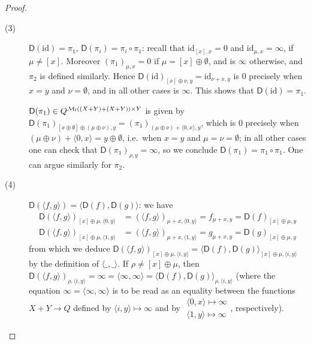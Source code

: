 \begin{proof}
\begin{description}
\item[(3)] $\mathsf D(\mathrm{id})=\pi_{1}$, $\mathsf D(\pi_{i})=\pi_{i}\circ \pi_{1}$: 
recall that $\mathrm{id}_{[x],x}=0$ and $\mathrm{id}_{\mu,x}=\infty$, if $\mu\neq [x]$. 
Moreover $(\pi_{1})_{\mu,x}=0$ if $\mu=[x]\oplus \emptyset$, and is $\infty$ otherwise, and $\pi_{2}$ is defined similarly.
Hence 
$\mathsf D(\mathrm{id})_{[x]\oplus\nu,y}=\mathrm{id}_{\nu+x,y}$ is $0$ precisely when $x=y$ and $\nu=\emptyset$, and in all other cases is $\infty$. This shows that $\mathsf D(\mathrm{id})=\pi_{1}$. 

$\mathsf D(\pi_{1})\in Q^{\mathcal{M}_{\mathsf f}((X+Y)+(X+Y))\times Y}$ is given by
$\mathsf D(\pi_{1})
_{
[x\oplus \emptyset] \oplus (\mu\oplus\nu),y
}= (\pi_{1})_{(\mu\oplus\nu)+\langle 0,x\rangle ,y }
$, 
which is 0 precisely when $(\mu\oplus\nu)+\langle 0,x\rangle= y\oplus\emptyset$, i.e.~when 
$x=y$ and $\mu=\nu=\emptyset$; in all other cases one can check that $\mathsf D(\pi_{1})_{\rho,y}=\infty$, so we conclude $\mathsf D(\pi_{1})=\pi_{1}\circ \pi_{1}$.
One can argue similarly for $\pi_{2}$.

\item[(4)] $\mathsf D(\langle f,g\rangle)=\langle \mathsf D(f),\mathsf D(g)\rangle$: 
we have
\begin{align*}
\mathsf D(\langle f,g\rangle)_{[x]\oplus\mu, \langle 0,y\rangle}& = 
(\langle f,g\rangle)_{\mu+x,\langle 0,y\rangle}= f_{\mu+x,y}= \mathsf D(f)_{[x]\oplus \mu,y}\\
\mathsf D(\langle f,g\rangle)_{[x]\oplus\mu, \langle 1,y\rangle}& = 
(\langle f,g\rangle)_{\mu+x,\langle 1,y\rangle}= g_{\mu+x,y}= \mathsf D(g)_{[x]\oplus \mu,y}
\end{align*}
from which we deduce
$\mathsf D(\langle f,g\rangle)_{[x]\oplus\mu, \langle i,y\rangle}=\langle \mathsf D(f),\mathsf D(g)\rangle_{[x]\oplus\mu, \langle i,y\rangle}$ 
 by the definition of $\langle \_,\_\rangle$.
 If $\rho\neq [x]\oplus\mu$, then
 $\mathsf D(\langle f,g\rangle)_{\rho, \langle i,y\rangle}=\infty=\langle \infty,\infty\rangle=\langle \mathsf D(f),\mathsf D(g)\rangle_{\rho, \langle i,y\rangle}$
 (where the equation $\infty=\langle \infty,\infty\rangle$ is to be read as an equality between the functions $ X+Y\longrightarrow Q$
 defined by $\langle i,y\rangle \mapsto \infty$ and by
 $\begin{matrix}
 \langle 0,x\rangle\mapsto\infty\\
  \langle 1,y\rangle\mapsto\infty
 \end{matrix}$, respectively).
 

\end{description}
\end{proof}
